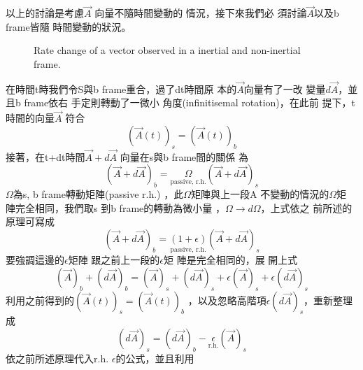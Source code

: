 \documentclass[12pt,a4paper]{article}
\begin{document}
\bigskip

以上的討論是考慮$\vec{A}$%
向量不隨時間變動的%
情況，接下來我們必%
須討論$\vec{A}$以及b frame皆隨%
時間變動的狀況。

\bigskip 
\begin{figure}[th]
\caption{Rate change of a vector observed in a inertial and non-inertial
frame.}
\begin{center}
\end{center}
\label{ratevecfig}
\end{figure}

\bigskip 在時間t時我們令S與b
frame重合，過了dt時間原%
本的$\vec{A}$向量有了一改%
變量$d\vec{A}$，並且b frame依右%
手定則轉動了一微小%
角度(infinitisemal rotation)，在此前%
提下，t時間的向量$\vec{A}$%
符合%
\begin{equation*}
\left( \vec{A}\left( t\right) \right) _{s}=\left( \vec{A}\left( t\right)
\right) _{b}
\end{equation*}%
接著，在t+dt時間$\vec{A}+d\vec{A}$%
向量在s與b frame間的關係%
為%
\begin{equation*}
\left( \vec{A}+d\vec{A}\right) _{b}=\underset{\text{passive, r.h.}}{\Omega }%
\left( \vec{A}+d\vec{A}\right) _{s}
\end{equation*}%
$\Omega $為s, b frame轉動矩陣(passive r.h.)%
，此$\Omega $矩陣與上一段A%
不變動的情況的$\Omega $矩%
陣完全相同，我們取s%
到b frame的轉動為微小量%
，$\Omega \rightarrow d\Omega $，上式依之%
前所述的原理可寫成%
\begin{equation*}
\left( \vec{A}+d\vec{A}\right) _{b}=\underset{\text{passive, r.h.}}{\left(
1+\epsilon \right) }\left( \vec{A}+d\vec{A}\right) _{s}
\end{equation*}%
要強調這邊的$\epsilon $矩陣%
跟之前上一段的$\epsilon $矩%
陣是完全相同的，展%
開上式%
\begin{equation*}
\left( \vec{A}\right) _{b}+\left( d\vec{A}\right) _{b}=\left( \vec{A}\right)
_{s}+\left( d\vec{A}\right) _{s}+\epsilon \left( \vec{A}\right)
_{s}+\epsilon \left( d\vec{A}\right) _{s}
\end{equation*}%
利用之前得到的$\left( \vec{A}%
\left( t\right) \right) _{s}=\left( \vec{A}\left( t\right) \right) _{b}$%
，以及忽略高階項$\epsilon
\left( d\vec{A}\right) _{s}$，重新整理成%
\begin{equation*}
\left( d\vec{A}\right) _{s}=\left( d\vec{A}\right) _{b}-\underset{\text{r.h.}%
}{\epsilon }\left( \vec{A}\right) _{s}
\end{equation*}%
依之前所述原理代入r.h. 
$\epsilon $的公式，並且利用%
\end{document}
